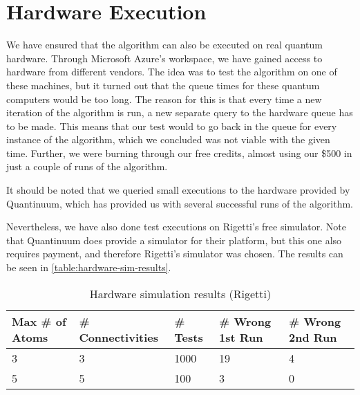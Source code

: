 \section{Hardware Execution}\label{sec:hardware-execution}
We have ensured that the algorithm can also be executed on real quantum hardware.
Through Microsoft Azure's workspace, we have gained access to hardware from different vendors.
The idea was to test the algorithm on one of these machines, but it turned out that the queue times for these quantum computers would be too long.
The reason for this is that every time a new iteration of the algorithm is run, a new separate query to the hardware queue has to be made.
This means that our test would to go back in the queue for every instance of the algorithm, which we concluded was not viable with the given time.
Further, we were burning through our free credits, almost using our \$500 in just a couple of runs of the algorithm.

It should be noted that we queried small executions to the hardware provided by Quantinuum, which has provided us with several successful runs of the algorithm.

Nevertheless, we have also done test executions on Rigetti's free simulator.
Note that Quantinuum does provide a simulator for their platform, but this one also requires payment, and therefore Rigetti's simulator was chosen.
The results can be seen in \autoref{table:hardware-sim-results}.

\begin{table}[h!]
\centering
\begin{tabularx}{\textwidth}{|X|X|X|X|X|}
\hline
Max \# of Atoms & \# Connectivities & \# Tests &  \# Wrong 1st Run & \# Wrong 2nd Run \\
\hline
3 & 3 & 1000 & 19 & 4 \\
5 & 5 &  100 &  3 & 0 \\
\hline
\end{tabularx}
\caption{Hardware simulation results (Rigetti)}
\label{table:hardware-sim-results}
\end{table}
